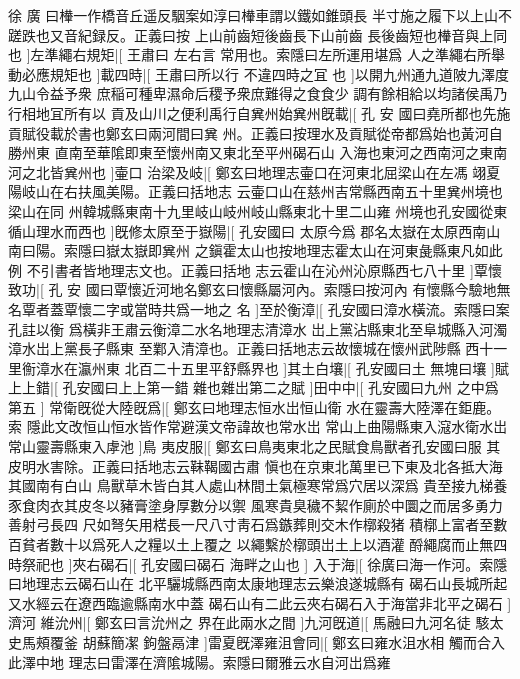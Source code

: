 徐%
廣%
%
曰檋一作橋音丘遥反駰案如淳曰檋車謂以鐵如錐頭長%
半寸施之履下以上山不蹉跌也又音紀録反。正義曰按%
%
上山前齒短後齒長下山前齒%
長後齒短也檋音與上同也%
]左準繩右規矩|[%
王肅曰%
左右言%
%
常用也。索隱曰左所運用堪爲%
人之準繩右所舉動必應規矩也%
]載四時|[%
王肅曰所以行%
不違四時之冝%
%
也%
%
]以開九州通九道陂九澤度九山令益予衆%
庶稲可種卑濕命后稷予衆庶難得之食食少%
調有餘相給以均諸侯禹乃行相地冝所有以%
貢及山川之便利禹行自兾州始兾州旣載|[%
孔%
安%
%
國曰堯所都也先施貢賦役載於書也鄭玄曰兩河間曰兾%
州。正義曰按理水及貢賦從帝都爲始也黃河自勝州東%
%
直南至華隂即東至懷州南又東北至平州碣石山%
入海也東河之西南河之東南河之北皆兾州也%
]壷口%
治梁及岐|[%
鄭玄曰地理志壷口在河東北屈梁山在左馮%
翊夏陽岐山在右扶風美陽。正義曰括地志%
%
云壷口山在慈州吉常縣西南五十里兾州境也梁山在同%
州韓城縣東南十九里岐山岐州岐山縣東北十里二山雍%
%
州境也孔安國從東%
循山理水而西也%
]旣修太原至于嶽陽|[%
孔安國曰%
太原今爲%
%
郡名太嶽在太原西南山南曰陽。索隱曰嶽太嶽即兾州%
之鎭霍太山也按地理志霍太山在河東彘縣東凡如此例%
%
不引書者皆地理志文也。正義曰括地%
志云霍山在沁州沁原縣西七八十里%
]覃懷致功|[%
孔%
安%
%
國曰覃懷近河地名鄭玄曰懷縣屬河內。索隱曰按河內%
有懷縣今驗地無名覃者蓋覃懷二字或當時共爲一地之%
%
名%
%
]至於衡漳|[%
孔安國曰漳水橫流。索隱曰案孔註以衡%
爲橫非王肅云衡漳二水名地理志清漳水%
%
岀上黨沾縣東北至阜城縣入河濁漳水岀上黨長子縣東%
至鄴入清漳也。正義曰括地志云故懷城在懷州武陟縣%
%
西十一里𢖍漳水在瀛州東%
北百二十五里平舒縣界也%
]其土白壤|[%
孔安國曰土%
無塊曰壤%
]賦%
上上錯|[%
孔安國曰上上第一錯%
雜也雜岀第二之賦%
]田中中|[%
孔安國曰九州%
之中爲第五%
]%
常衛旣從大陸旣爲|[%
鄭玄曰地理志恒水岀恒山衛%
水在靈壽大陸澤在鉅鹿。索%
%
隱此文改恒山恒水皆作常避漢文帝諱故也常水岀%
常山上曲陽縣東入滱水衛水岀常山靈壽縣東入虖池%
]鳥%
夷皮服|[%
鄭玄曰鳥夷東北之民賦食鳥獸者孔安國曰服%
其皮明水害除。正義曰括地志云靺鞨國古肅%
%
愼也在京東北萬里已下東及北各抵大海其國南有白山%
鳥獸草木皆白其人處山林間土氣極寒常爲穴居以深爲%
%
貴至接九梯養豕食肉衣其皮冬以豬膏塗身厚數分以禦%
風寒貴臭穢不絜作廁於中圜之而居多勇力善射弓長四%
%
尺如弩矢用楛長一尺八寸靑石爲鏃葬則交木作槨殺猪%
積槨上富者至數百貧者數十以爲死人之糧以土上覆之%
%
以繩繫於槨頭岀土上以酒灌%
酹繩腐而止無四時祭祀也%
]夾右碣石|[%
孔安國曰碣石%
海畔之山也%
]%
入于海|[%
徐廣曰海一作河。索隱曰地理志云碣石山在%
北平驪城縣西南太康地理志云樂浪遂城縣有%
%
碣石山長城所起又水經云在遼西臨逾縣南水中蓋%
碣石山有二此云夾右碣石入于海當非北平之碣石%
]濟河%
維沇州|[%
鄭玄曰言沇州之%
界在此兩水之間%
]九河旣道|[%
馬融曰九河名徒%
駭太史馬頰覆釜%
%
胡蘇簡㓗%
鉤盤鬲津%
]雷夏旣澤雍沮會同|[%
鄭玄曰雍水沮水相%
觸而合入此澤中地%
%
理志曰雷澤在濟隂城陽。索隱曰爾雅云水自河岀爲雍%
